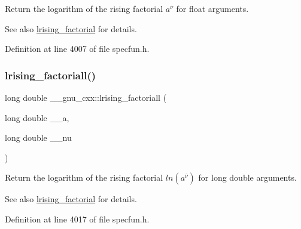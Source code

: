 Return the logarithm of the rising factorial $ a^{\overline{\nu}} $ for float arguments.

\begin{DoxySeeAlso}{See also}
\hyperlink{group__mathsf__gnu_ga8912b75b2f7592fb61128c766e7313b9}{lrising\+\_\+factorial} for details. 
\end{DoxySeeAlso}


Definition at line 4007 of file specfun.\+h.

\mbox{\label{group__mathsf__gnu_ga1ac811f56f38f7ea7a1e035ec0157f6b}} 
\subsubsection{\texorpdfstring{lrising\+\_\+factoriall()}{lrising\_factoriall()}}
{\footnotesize\ttfamily long double \+\_\+\+\_\+gnu\+\_\+cxx\+::lrising\+\_\+factoriall (\begin{DoxyParamCaption}\item[{long double}]{\+\_\+\+\_\+a,  }\item[{long double}]{\+\_\+\+\_\+nu }\end{DoxyParamCaption})\hspace{0.3cm}{\ttfamily [inline]}}

Return the logarithm of the rising factorial $ ln(a^{\overline{\nu}}) $ for {\ttfamily  long double } arguments.

\begin{DoxySeeAlso}{See also}
\hyperlink{group__mathsf__gnu_ga8912b75b2f7592fb61128c766e7313b9}{lrising\+\_\+factorial} for details. 
\end{DoxySeeAlso}


Definition at line 4017 of file specfun.\+h.

\mbox{\label{group__mathsf__gnu_ga1a51079e00fbe5473d8cf9ad3304c5c6}} 

